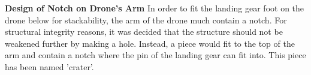 


\textbf{Design of Notch on Drone's Arm} \newline
In order to fit the landing gear foot on the drone below for stackability, the arm of the drone much contain a notch. For structural integrity reasons, it was decided that the structure should not be weakened further by making a hole. Instead, a piece would fit to the top of the arm and contain a notch where the pin of the landing gear can fit into. This piece has been named 'crater'. 

